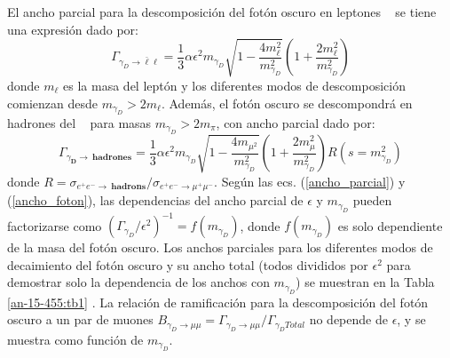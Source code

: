 El ancho parcial %
para la descomposición del fotón oscuro en leptones \ME ~ se tiene una expresión dado por:
\begin{equation}\label{ancho_parcial}
\Gamma_{\gamma_D \rightarrow \bar{\ell}\ell} = \dfrac{1}{3}\alpha \epsilon^2 m_{\gamma_D} \sqrt{1- \dfrac{4m_\ell^2}{m_{\gamma_D}^2}}
\left( 1 + \dfrac{2m_\ell^2}{m_{\gamma_D}^2}\right) 
\end{equation}
donde $m_\ell$ es la masa del leptón y los diferentes modos de descomposición comienzan desde $m_{\gamma_D} > 2 m_\ell$. Además, el fotón oscuro se descompondrá en hadrones del \ME ~ para masas $m_{\gamma_D} > 2 m_\pi$, con ancho parcial dado por:
\begin{equation}\label{ancho_foton}
\Gamma_{\gamma_\mathbf{D} \rightarrow ~ \mathbf{hadrones}}= \dfrac{1}{3} \alpha \epsilon^2 m_{\gamma_D} \sqrt{1 -\dfrac{4 m_{\mu^2}}{m_{\gamma_D}^2}} \left( 1 + \dfrac{2 m_\mu^2}{m_{\gamma_D}^2}\right) R(s = m_{\gamma_D}^2)
\end{equation}
donde $R = \sigma_{e^+ e^- \rightarrow ~ \mathbf{hadrons}} / \sigma_{e^+ e^- \rightarrow \mu^+ \mu^-}$. %
Según las ecs. (\ref{ancho_parcial}) y (\ref{ancho_foton}), las dependencias del ancho parcial de $\epsilon$ y $m_{\gamma_D}$ pueden factorizarse como $ (\Gamma_{\gamma_D}/\epsilon^2)^{-1}= f (m_{\gamma_D})$, donde $f (m_{\gamma_D})$ es solo dependiente de la masa del fotón oscuro. Los anchos parciales para los diferentes modos de decaimiento del fotón oscuro y su ancho total (todos divididos por $\epsilon^2$ para demostrar solo la dependencia de los anchos con $m_{\gamma_D}$) se muestran en la Tabla \ref{an-15-455:tb1} %
. La relación de ramificación para la descomposición del fotón oscuro a un par de muones $B_{\gamma_D\rightarrow \mu\mu} = \Gamma_{\gamma_D\rightarrow \mu\mu} /\Gamma_{\gamma_D Total}$ no depende de $\epsilon$, y se muestra %
como función de $m_{\gamma_D}$. %

